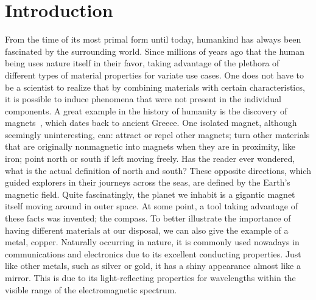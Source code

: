 
%

\chapter{Introduction}
\label{ch:introduction}

From the time of its most primal form until today, humankind has always been fascinated by the surrounding world.
Since millions of years ago that the human being uses nature itself in their favor, taking advantage of the plethora of different types of material properties for variate use cases.
One does not have to be a scientist to realize that by combining materials with certain characteristics, it is possible to induce phenomena that were not present in the individual components.
A great example in the history of humanity is the discovery of magnets~\cite{Discovery_magnets_1932}, which dates back to ancient Greece.
One isolated magnet, although seemingly uninteresting, can: attract or repel other magnets; turn other materials that are originally nonmagnetic into magnets when they are in proximity, like iron; point north or south if left moving freely.
Has the reader ever wondered, what is the actual definition of north and south?
These opposite directions, which guided explorers in their journeys across the seas, are defined by the Earth's magnetic field.
Quite fascinatingly, the planet we inhabit is a gigantic magnet itself moving around in outer space.
At some point, a tool taking advantage of these facts was invented; the compass.
To better illustrate the importance of having different materials at our disposal, we can also give the example of a metal, copper.
Naturally occurring in nature, it is commonly used nowadays in communications and electronics due to its excellent conducting properties.
Just like other metals, such as silver or gold, it has a shiny appearance almost like a mirror.
This is due to its light-reflecting properties for wavelengths within the visible range of the electromagnetic spectrum.

